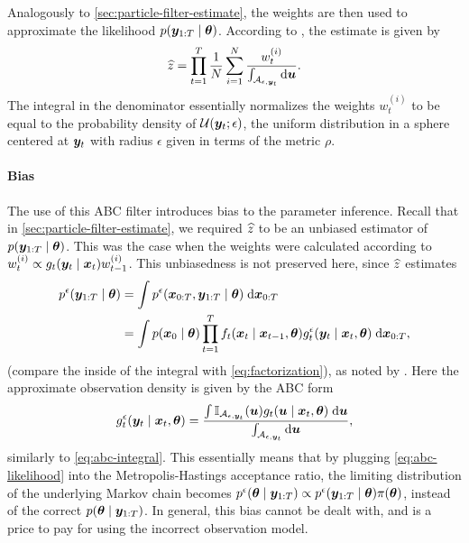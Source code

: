 Analogously to \autoref{sec:particle-filter-estimate}, the weights are then used to approximate the likelihood $p(\bm{y}_{1:T} \mid \bm{\theta})$. According to \cite{jasra-time-series}, the estimate is given by
\begin{equation} \label{eq:abc-likelihood}
\widehat{z} = \prod_{t=1}^T \frac{1}{N} \sum_{i=1}^N \frac{w_t^{(i)}}{\int_{\mathcal{A}_{\epsilon, \bm{y}_t}} \mathrm{d}{\bm{u}}}.
\end{equation}
The integral in the denominator essentially normalizes the weights $w_t^{(i)}$ to be equal to the probability density of $\mathcal{U}(\bm{y}_t; \epsilon)$, the uniform distribution in a sphere centered at $\bm{y}_t$ with radius $\epsilon$ given in terms of the metric $\rho$.

\paragraph{Bias}
The use of this ABC filter introduces bias to the parameter inference. Recall that in \autoref{sec:particle-filter-estimate}, we required $\widehat{z}$ to be an unbiased estimator of $p(\bm{y}_{1:T} \mid \bm{\theta})$. This was the case when the weights were calculated according to $w_t^{(i)} \propto g_t(\bm{y}_t \mid \bm{x}_t) w_{t-1}^{(i)}$. This unbiasedness is not preserved here, since $\widehat{z}$ estimates
\begin{equation*}
\begin{split}
p^\epsilon(\bm{y}_{1:T} \mid \bm{\theta}) &= \int p^\epsilon(\bm{x}_{0:T}, \bm{y}_{1:T} \mid \bm{\theta}) \; \mathrm{d}{\bm{x}_{0:T}} \\
&= \int p(\bm{x}_0 \mid \bm{\theta}) \prod_{t=1}^T f_t(\bm{x}_t \mid \bm{x}_{t-1}, \bm{\theta}) g_t^\epsilon(\bm{y}_t \mid \bm{x}_t, \bm{\theta}) \; \mathrm{d}{\bm{x}_{0:T}},
\end{split}
\end{equation*}
(compare the inside of the integral with \eqref{eq:factorization}), as noted by \cite{jasra-time-series}. Here the approximate observation density is given by the ABC form
\begin{equation*}
g_t^\epsilon(\bm{y}_t \mid \bm{x}_t, \bm{\theta}) = \frac{\int \mathbb{I}_{\mathcal{A}_{\epsilon, \bm{y}_t}}(\bm{u}) g_t(\bm{u} \mid \bm{x}_t, \bm{\theta}) \; \mathrm{d}{\bm{u}}}{\int_{\mathcal{A}_{\epsilon, \bm{y}_t}} \mathrm{d}{\bm{u}}},
\end{equation*}
similarly to \eqref{eq:abc-integral}. This essentially means that by plugging \eqref{eq:abc-likelihood} into the Metropolis-Hastings acceptance ratio, the limiting distribution of the underlying Markov chain becomes $p^\epsilon(\bm{\theta} \mid \bm{y}_{1:T}) \propto p^\epsilon(\bm{y}_{1:T} \mid \bm{\theta}) \pi(\bm{\theta})$, instead of the correct $p(\bm{\theta} \mid \bm{y}_{1:T})$. In general, this bias cannot be dealt with, and is a price to pay for using the incorrect observation model.

